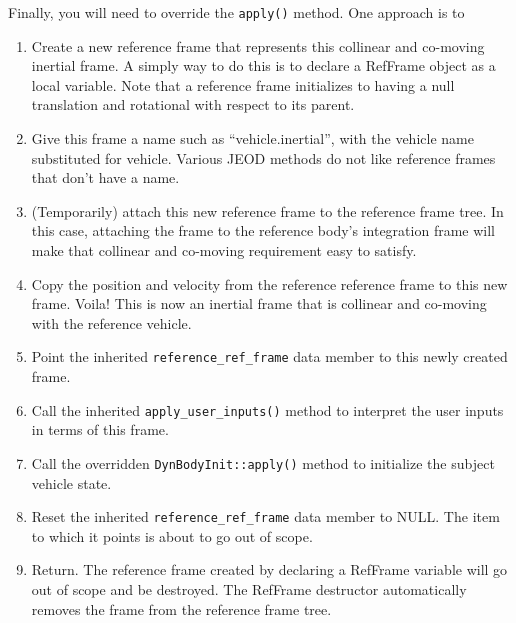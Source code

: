 Finally, you will need to override the {\tt apply()} method. One approach is to
\begin{enumerate}
\item Create a new reference frame that represents this collinear and co-moving
inertial frame. A simply way to do this is to declare a RefFrame object as
a local variable. Note that a reference frame initializes to having a null
translation and rotational with respect to its parent.
\item Give this frame a name such as ``vehicle.inertial'', with the
vehicle name substituted for vehicle.
Various JEOD methods do not like reference frames that don't have a name.
\item (Temporarily) attach this new reference frame to the reference frame tree.
In this case, attaching the frame to the reference body's integration frame
will make that collinear and co-moving requirement easy to satisfy.
\item Copy the position and velocity from the reference reference frame to
this new frame. Voila! This is now an inertial frame that is collinear and
co-moving with the reference vehicle.
\item Point the inherited {\tt reference\_ref\_frame} data member to this
newly created frame.
\item Call the inherited {\tt apply\_user\_inputs()} method to interpret the
user inputs in terms of this frame.
\item Call the overridden {\tt DynBodyInit::apply()} method to initialize
the subject vehicle state.
\item Reset the inherited {\tt reference\_ref\_frame} data member to NULL.
The item to which it points is about to go out of scope.
\item Return. The reference frame created by declaring a RefFrame variable
will go out of scope and be destroyed. The RefFrame destructor automatically
removes the frame from the reference frame tree.
\end{enumerate}
